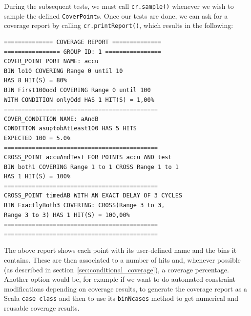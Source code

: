 \documentclass[conference]{IEEEtran}
\begin{document}
During the subsequent tests, we must call \texttt{cr.sample()} whenever we wish to sample the defined \texttt{CoverPoint}s. %
Once our tests are done, we can ask for a coverage report by calling \texttt{cr.printReport()}, which results in the following: 
\begin{verbatim}
============== COVERAGE REPORT ==============
================ GROUP ID: 1 ================
COVER_POINT PORT NAME: accu
BIN lo10 COVERING Range 0 until 10 
HAS 8 HIT(S) = 80%
BIN First100odd COVERING Range 0 until 100 
WITH CONDITION onlyOdd HAS 1 HIT(S) = 1,00%
============================================
COVER_CONDITION NAME: aAndB
CONDITION asuptobAtLeast100 HAS 5 HITS 
EXPECTED 100 = 5.0%
============================================
CROSS_POINT accuAndTest FOR POINTS accu AND test
BIN both1 COVERING Range 1 to 1 CROSS Range 1 to 1 
HAS 1 HIT(S) = 100%
============================================
CROSS_POINT timedAB WITH AN EXACT DELAY OF 3 CYCLES
BIN ExactlyBoth3 COVERING: CROSS(Range 3 to 3, 
Range 3 to 3) HAS 1 HIT(S) = 100,00%
============================================
============================================
\end{verbatim}
The above report shows each point with its user-defined name and the bins it contains. These are then associated to a number of hits and, whenever possible (as described in section~\ref{sec:conditional_coverage}), a coverage percentage.
Another option would be, for example if we want to do automated constraint modifications depending on coverage results, to generate the coverage report as a Scala \texttt{case class} and then to use its \texttt{binNcases} method to get numerical and reusable coverage results.  
\end{document}

